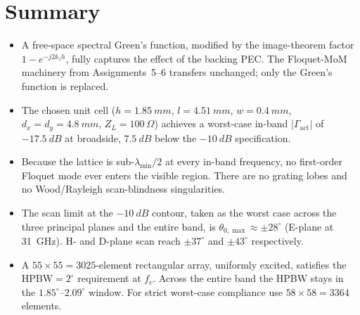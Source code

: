 \documentclass{article}
\begin{document}
\section{Summary}

\begin{itemize}
\item A free-space spectral Green's function, modified by the image-theorem factor $1 - e^{-j2k_z h}$, fully captures the effect of the backing PEC. The Floquet-MoM machinery from Assignments~5--6 transfers unchanged; only the Green's function is replaced.
\item The chosen unit cell ($h = \SI{1.85}{mm}$, $l = \SI{4.51}{mm}$, $w = \SI{0.4}{mm}$, $d_x=d_y = \SI{4.8}{mm}$, $Z_L = \SI{100}{\Omega}$) achieves a worst-case in-band $|\Gamma_{\text{act}}|$ of $\SI{-17.5}{dB}$ at broadside, $\SI{7.5}{dB}$ below the $\SI{-10}{dB}$ specification.
\item Because the lattice is sub-$\lambda_{\min}/2$ at every in-band frequency, no first-order Floquet mode ever enters the visible region. There are no grating lobes and no Wood/Rayleigh scan-blindness singularities.
\item The scan limit at the $\SI{-10}{dB}$ contour, taken as the worst case across the three principal planes and the entire band, is $\theta_{0,\max} \approx \pm 28^\circ$ (E-plane at \SI{31}{GHz}). H- and D-plane scan reach $\pm 37^\circ$ and $\pm 43^\circ$ respectively.
\item A $55\times 55 = 3025$-element rectangular array, uniformly excited, satisfies the $\mathrm{HPBW} = 2^\circ$ requirement at $f_c$. Across the entire band the HPBW stays in the $1.85^\circ$--$2.09^\circ$ window. For strict worst-case compliance use $58\times 58 = 3364$ elements.
\end{itemize}
\end{document}
